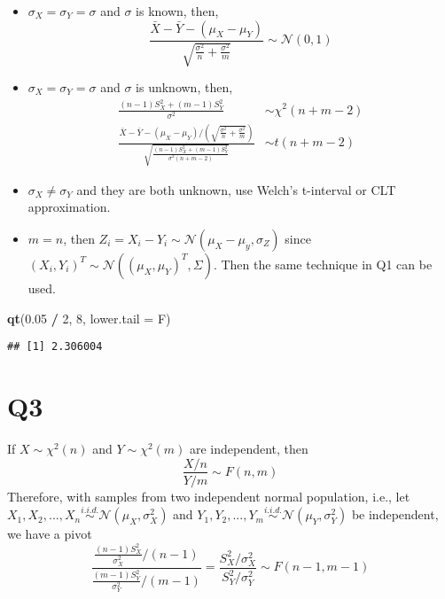 \documentclass[
]{book}
\newenvironment{Shaded}{\begin{snugshade}}{\end{snugshade}}
\newcommand{\DataTypeTok}[1]{\textcolor[rgb]{0.13,0.29,0.53}{#1}}
\newcommand{\DecValTok}[1]{\textcolor[rgb]{0.00,0.00,0.81}{#1}}
\newcommand{\FloatTok}[1]{\textcolor[rgb]{0.00,0.00,0.81}{#1}}
\newcommand{\KeywordTok}[1]{\textcolor[rgb]{0.13,0.29,0.53}{\textbf{#1}}}
\newcommand{\NormalTok}[1]{#1}
\newcommand{\OperatorTok}[1]{\textcolor[rgb]{0.81,0.36,0.00}{\textbf{#1}}}
\newcommand{\StringTok}[1]{\textcolor[rgb]{0.31,0.60,0.02}{#1}}
\theoremstyle{definition}
\theoremstyle{definition}
\theoremstyle{definition}
\theoremstyle{remark}
\begin{document}
\begin{itemize}
\item
  \(\sigma_X=\sigma_Y=\sigma\) and \(\sigma\) is known, then,
  \begin{equation}
  \frac{\bar X - \bar Y - (\mu_X-\mu_Y)}{\sqrt{\frac{\sigma^2}{n}+\frac{\sigma^2}{m}}}\sim \mathcal{N}(0,1)
  \end{equation}
\item
  \(\sigma_X=\sigma_Y=\sigma\) and \(\sigma\) is unknown, then,
  \begin{align}
  \frac{(n-1)S_X^2+(m-1)S_Y^2}{\sigma^2}&\sim \chi^2(n+m-2)\\
  \frac{\bar X - \bar Y-(\mu_X-\mu_Y)/\left(\sqrt{\frac{\sigma^2}{n}+\frac{\sigma^2}{m}}\right)}{\sqrt{\frac{(n-1)S_X^2+(m-1)S_Y^2}{\sigma^2(n+m-2)}}}&\sim t(n+m-2)
  \end{align}
\item
  \(\sigma_X\neq\sigma_Y\) and they are both unknown, use Welch's t-interval or CLT approximation.
\item
  \(m=n\), then \(Z_i = X_i-Y_i\sim\mathcal{N}(\mu_X-\mu_y,\sigma_Z)\) since \((X_i,Y_i)^T\sim \mathcal{N}\left((\mu_X,\mu_Y)^T, \Sigma\right)\). Then the same technique in Q1 can be used.
\end{itemize}

\begin{Shaded}
\begin{Highlighting}[]
\KeywordTok{qt}\NormalTok{(}\FloatTok{0.05} \OperatorTok{/}\StringTok{ }\DecValTok{2}\NormalTok{, }\DecValTok{8}\NormalTok{, }\DataTypeTok{lower.tail =}\NormalTok{ F)}
\end{Highlighting}
\end{Shaded}

\begin{verbatim}
## [1] 2.306004
\end{verbatim}

\hypertarget{q3-2}{%
\section{Q3}\label{q3-2}}

If \(X\sim \chi^2(n)\) and \(Y\sim\chi^2(m)\) are independent, then
\[
\frac{X/n}{Y/m}\sim F(n, m)
\]
Therefore, with samples from two independent normal population, i.e., let \(X_1,X_2,...,X_n\stackrel{i.i.d.}{\sim}\mathcal{N}(\mu_X,\sigma^2_X)\) and \(Y_1,Y_2,...,Y_m\stackrel{i.i.d.}{\sim}\mathcal{N}(\mu_Y,\sigma^2_Y)\) be independent, we have a pivot
\begin{equation}
\frac{\frac{(n-1)S_X^2}{\sigma^2_X} / (n-1)}{\frac{(m-1)S_Y^2}{\sigma^2_Y}/(m-1)} = \frac{S_X^2/\sigma^2_X}{S_Y^2/\sigma^2_Y}\sim F(n-1, m-1)
\end{equation}
\end{document}
